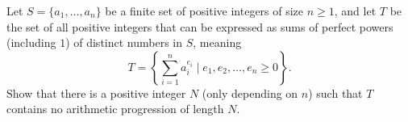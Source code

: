 Let $S = \{a_1, \ldots, a_n \}$ be a finite set of positive integers of size $n \ge 1$,  and let $T$ be the set of all positive integers that can be expressed as sums of perfect powers (including $1$) of distinct numbers in $S$,  meaning\[ T = \left\{ \sum_{i=1}^n a_i^{e_i} \mid e_1, e_2, \dots, e_n \ge 0 \right\}. \]Show that there is a positive integer $N$ (only depending on $n$) such that $T$ contains no arithmetic progression of length $N$.
